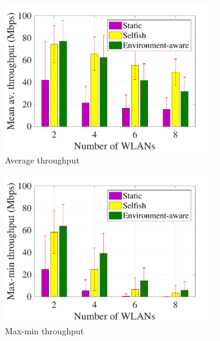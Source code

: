 \documentclass{article}
\begin{document}
\begin{figure}[h!]
	\centering
	\begin{subfigure}[b]{0.3\textwidth}
		\includegraphics[width=\textwidth]{scalability_mean_tpt}
		\caption{Average throughput}
		\label{fig:scalability_mean_tpt}
	\end{subfigure}
	\begin{subfigure}[b]{0.3\textwidth}
		\includegraphics[width=\textwidth]{scalability_mean_maxmin}
		\caption{Max-min throughput}
		\label{fig:scalability_mean_maxmin}
	\end{subfigure}
	\begin{subfigure}[b]{0.3\textwidth}

\end{subfigure}
\end{figure}
\end{document}
